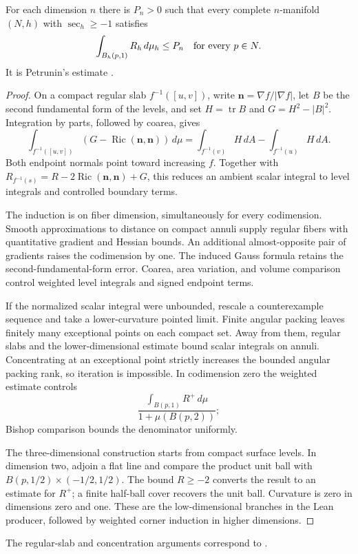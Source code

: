 \begin{theorem}\label{thm:rf-scalar-integral}
For each dimension $n$ there is $P_n>0$ such that every complete
$n$-manifold $(N,h)$ with $\sec_h\geq-1$ satisfies
\[
             \int_{B_h(p,1)}R_h\,d\mu_h\leq P_n
                         \quad\hbox{for every }p\in N.
\]
It is Petrunin's estimate \cite[Theorem 1.1, manuscript p.~1]{Petrunin2009}.
\end{theorem}
\begin{proof}
On a compact regular slab $f^{-1}([u,v])$, write
$\mathbf n=\nabla f/|\nabla f|$, let $B$ be the second fundamental
form of the levels, and set $H=\operatorname{tr}B$ and $G=H^2-|B|^2$.
Integration by parts, followed by coarea, gives
\[
 \int_{f^{-1}([u,v])}(G-\operatorname{Ric}(\mathbf n,\mathbf n))\,d\mu
 =\int_{f^{-1}(v)}H\,dA-\int_{f^{-1}(u)}H\,dA.
\]
Both endpoint normals point toward increasing $f$. Together with
$R_{f^{-1}(s)}=R-2\operatorname{Ric}(\mathbf n,\mathbf n)+G$,
this reduces an ambient scalar integral to level integrals and
controlled boundary terms.

The induction is on fiber dimension, simultaneously for every
codimension. Smooth approximations to distance on compact annuli
supply regular fibers with quantitative gradient and Hessian bounds.
An additional almost-opposite pair of gradients raises the
codimension by one. The induced Gauss formula retains the
second-fundamental-form error. Coarea, area variation, and volume
comparison control weighted level integrals and signed endpoint terms.

If the normalized scalar integral were unbounded, rescale a
counterexample sequence and take a lower-curvature pointed limit.
Finite angular packing leaves finitely many exceptional points on
each compact set. Away from them, regular slabs and the
lower-dimensional estimate bound scalar integrals on annuli.
Concentrating at an exceptional point strictly increases the bounded
angular packing rank, so iteration is impossible. In codimension zero
the weighted estimate controls
\[
 \frac{\int_{B(p,1)}R^+\,d\mu}{1+\mu(B(p,2))};
\]
Bishop comparison bounds the denominator uniformly.

The three-dimensional construction starts from compact surface
levels. In dimension two, adjoin a flat line and compare the product
unit ball with $B(p,1/2)\times(-1/2,1/2)$. The bound $R\geq-2$
converts the result to an estimate for $R^+$; a finite half-ball
cover recovers the unit ball. Curvature is zero in dimensions zero
and one. These are the low-dimensional branches in the Lean
producer, followed by weighted corner induction in higher dimensions.
\end{proof}
The regular-slab and concentration arguments correspond to
\cite[Sections 3.1--3.7, pp.~5--7; Sections 4.3--4.7,
pp.~8--14]{Petrunin2009}.

